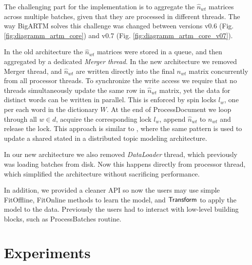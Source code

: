 \documentclass[russian,english]{llncs}
\newcommand{\kw}[1]{\mbox{\textsf{#1}}}
\begin{document}
The challenging part for the implementation is to aggregate the $\hat n_{wt}$ matrices across multiple batches,
given that they are processed in different threads.
The way BigARTM solves this challenge was changed between versions \kw{v0.6} (Fig. \ref{fig:diagramm_artm_core})
and \kw{v0.7} (Fig. \ref{fig:diagramm_artm_core_v07}).

In the old architecture the $\hat n_{wt}$ matrices were stored in a queue,
and then aggregated by a dedicated \emph{Merger thread}.
In the new architecture we removed Merger thread,
and $\hat n_{wt}$ are written directly into the final $n_{wt}$ matrix
concurrently from all processor threads.
To synchronize the write access we require that
no threads simultaneously update the same row in $\hat n_{wt}$ matrix,
yet the data for distinct words can be written in parallel.
This is enforced by spin locks $l_w$, one per each word in the dictionary $W$.
At the end of \kw{ProcessDocument} we loop through all $w \in d$, acquire the corresponding lock $l_w$, append $\hat n_{wt}$ to $n_{wt}$ and release the lock.
This approach is similar to \cite{smola10architecture},
where the same pattern is used to update a shared stated in a distributed topic modeling architecture.

In our new architecture we also removed \emph{DataLoader} thread, which previously was loading batches from disk.
Now this happens directly from processor thread, which simplified the architecture without sacrificing performance.

In addition, we provided a cleaner API so now the users may use simple \kw{FitOffline}, \kw{FitOnline} methods to learn the model,
and $\kw{Transform}$ to apply the model to the data.
Previously the users had to interact with low-level building blocks, such as \kw{ProcessBatches} routine.

\section{Experiments}
\label{sec:Experiments}
\end{document}
